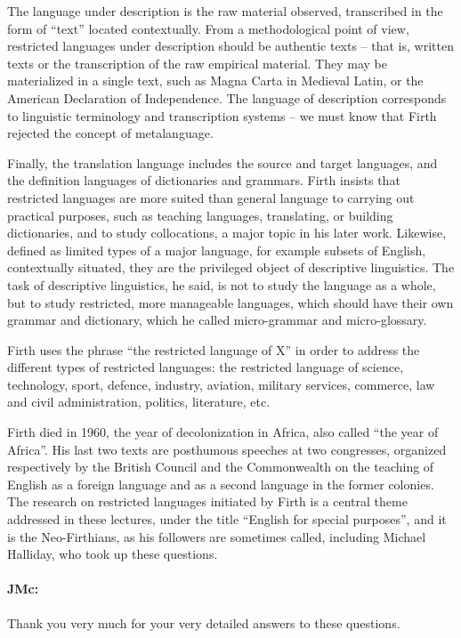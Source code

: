 \documentclass[output=paper]{langscibook}
\begin{document}
The language under description is the raw material observed, transcribed in the form of “text” located contextually. From a methodological point of view, restricted languages under description should be authentic texts – that is, written texts or the transcription of the raw empirical material. They may be materialized in a single text, such as Magna Carta in Medieval Latin, or the American Declaration of Independence. The language of description corresponds to linguistic terminology and transcription systems – we must know that Firth rejected the concept of metalanguage.

Finally, the translation language includes the source and target languages, and the definition languages of dictionaries and grammars. Firth insists that restricted languages are more suited than general language to carrying out practical purposes, such as teaching languages, translating, or building dictionaries, and to study collocations, a major topic in his later work. Likewise, defined as limited types of a major language, for example subsets of English, contextually situated, they are the privileged object of descriptive linguistics. The task of descriptive linguistics, he said, is not to study the language as a whole, but to study restricted, more manageable languages, which should have their own grammar and dictionary, which he called micro-grammar and micro-glossary.

Firth uses the phrase “the restricted language of X” in order to address the different types of restricted languages: the restricted language of science, technology, sport, defence, industry, aviation, military services, commerce, law and civil administration, politics, literature, etc.

Firth died in 1960, the year of decolonization in Africa, also called “the year of Africa”. His last two texts are posthumous speeches at two congresses, organized respectively by the British Council and the Commonwealth on the teaching of English as a foreign language and as a second language in the former colonies. The research on restricted languages initiated by Firth is a central theme addressed in these lectures, under the title “English for special purposes”, and it is the Neo-Firthians, as his followers are sometimes called, including Michael Halliday, who took up these questions.

\paragraph*{JMc:} Thank you very much for your very detailed answers to these questions.
\end{document}
